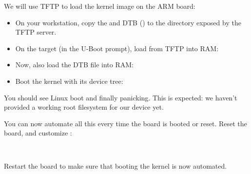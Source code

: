 {}
{}

We will use TFTP to load the kernel image on the ARM board:

\begin{itemize}

\item On your workstation, copy the  and DTB
()
to the directory exposed by the TFTP server.

\item On the target (in the U-Boot prompt), load  from
TFTP into RAM:
{}
{}

\item Now, also load the DTB file into RAM:\\
{}
{}

\item Boot the kernel with its device tree:\\
{}
{}

\end{itemize}

You should see Linux boot and finally panicking. This is expected: we
haven't provided a working root filesystem for our device yet.

You can now automate all this every time the board is booted or
reset. Reset the board, and customize :

\scriptsize
{}
{
\\
}
\normalsize

Restart the board to make sure that booting the kernel is now automated.

